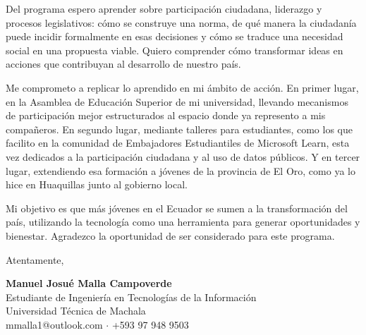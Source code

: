 \documentclass[letterpaper,11pt]{article}
\begin{document}
Del programa espero aprender sobre participación ciudadana, liderazgo y
procesos legislativos: cómo se construye una norma, de qué manera la
ciudadanía puede incidir formalmente en esas decisiones y cómo se traduce una
necesidad social en una propuesta viable. Quiero comprender
cómo transformar ideas en acciones que contribuyan al desarrollo de nuestro
país.

Me comprometo a replicar lo aprendido en mi ámbito de acción. En primer lugar,
en la Asamblea de Educación Superior de mi universidad,
llevando mecanismos de participación mejor estructurados al espacio donde ya
represento a mis compañeros. En segundo lugar, mediante talleres para
estudiantes, como los que facilito en la comunidad de Embajadores Estudiantiles
de Microsoft Learn, esta vez dedicados a la participación ciudadana y al uso de
datos públicos. Y en tercer lugar, extendiendo esa formación a jóvenes de la
provincia de El Oro, como ya lo hice en Huaquillas junto al gobierno local.

Mi objetivo es que más jóvenes en el Ecuador se sumen a la transformación del
país, utilizando la tecnología como una herramienta para generar oportunidades
y bienestar. Agradezco la oportunidad de ser considerado para este programa.

\vspace{6pt}
Atentamente,

\vspace{20pt}
\textbf{Manuel Josué Malla Campoverde}\\
{\small Estudiante de Ingeniería en Tecnologías de la Información\\
Universidad Técnica de Machala\\
mmalla1@outlook.com $\cdot$ +593 97 948 9503}
\end{document}
